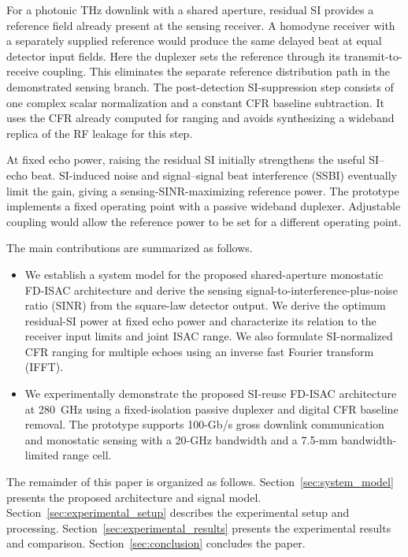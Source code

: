 \documentclass[10pt,journal]{IEEEtran}
\DeclareRobustCommand{\rev}[1]{\textcolor{revisioncolor}{#1}}
\begin{document}
\rev{For a photonic THz downlink with a shared aperture, residual SI
provides a reference field already present at the sensing receiver.
A homodyne receiver with a separately supplied reference would
produce the same delayed beat at equal detector input fields. Here
the duplexer sets the reference through its transmit-to-receive
coupling. This eliminates the separate reference distribution path
in the demonstrated sensing branch. The post-detection SI-suppression
step consists of one complex scalar normalization and a constant
CFR baseline subtraction. It uses the CFR already computed for
ranging and avoids synthesizing a wideband replica of the RF
leakage for this step.}

\rev{At fixed echo power, raising the residual SI initially strengthens
the useful SI--echo beat. SI-induced noise and signal--signal beat
interference (SSBI) eventually limit the gain, giving a
sensing-SINR-maximizing reference power. The prototype implements a
fixed operating point with a passive wideband duplexer. Adjustable
coupling would allow the reference power to be set for a different
operating point.}

The main contributions are summarized as follows.
\begin{itemize}

\item We establish a system model for the proposed shared-aperture
monostatic FD-ISAC architecture and derive the sensing signal-to-interference-plus-noise ratio (SINR) from the
square-law detector output. \rev{We derive the optimum residual-SI power at fixed echo power
and characterize its relation to the receiver input limits and
joint ISAC range. We also formulate SI-normalized CFR ranging
for multiple echoes using an inverse fast Fourier transform
(IFFT).}

\item We experimentally demonstrate the proposed SI-reuse FD-ISAC
architecture at 280~GHz \rev{using a fixed-isolation passive duplexer and digital CFR baseline
removal. The prototype supports} 100-Gb/s gross downlink
communication and monostatic sensing with a 20-GHz bandwidth and a
7.5-mm bandwidth-limited range cell.

\end{itemize}

The remainder of this paper is organized as follows.
Section~\ref{sec:system_model} presents the proposed architecture and
signal model. Section~\ref{sec:experimental_setup} describes the
experimental setup and processing. Section~\ref{sec:experimental_results}
presents the experimental results and comparison.
Section~\ref{sec:conclusion} concludes the paper.
\end{document}
